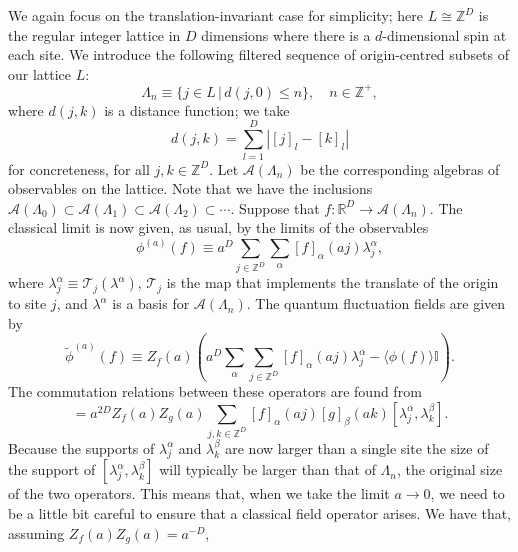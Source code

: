 \documentclass[prl,twocolumn,lengthcheck,superscriptaddress]{revtex4-1}
\theoremstyle{definition}
\theoremstyle{remark}
\begin{document}
We again focus on the translation-invariant case for simplicity; here $L\cong \mathbb{Z}^{D}$ is the regular integer lattice in $D$ dimensions where there is a $d$-dimensional spin at each site.  We introduce the following filtered sequence of origin-centred subsets of our lattice $L$:
\begin{equation}
	\Lambda_n \equiv \{j\in L\,|\, d(j,0) \le n\}, \quad n\in \mathbb{Z}^+,
\end{equation}
where $d(j,k)$ is a distance function; we take
\begin{equation}
	d(j,k) = \sum_{l=1}^D |[j]_l-[k]_l|
\end{equation}
for concreteness, for all $j,k\in \mathbb{Z}^D$. Let $\mathcal{A}(\Lambda_n)$ be the corresponding algebras of observables on the lattice. Note that we have the inclusions $\mathcal{A}(\Lambda_0)\subset\mathcal{A}(\Lambda_1)\subset \mathcal{A}(\Lambda_2) \subset \cdots$. Suppose that $f:\mathbb{R}^D\rightarrow \mathcal{A}(\Lambda_n)$. The classical limit is now given, as usual, by the limits of the observables
\begin{equation}
	\phi^{(a)}(f) \equiv a^D\sum_{j\in\mathbb{Z}^D} \sum_{\alpha} [f]_\alpha(aj) \lambda_j^\alpha,
\end{equation}
where $\lambda_j^\alpha \equiv \mathcal{T}_j(\lambda^\alpha)$, $\mathcal{T}_j$ is the map that implements the translate of the origin to site $j$, and $\lambda^\alpha$ is a basis for $\mathcal{A}(\Lambda_n)$. The quantum fluctuation fields are given by
\begin{equation}
	\widetilde{\phi}^{(a)}(f) \equiv Z_f(a)\left( a^D\sum_{\alpha}\sum_{j\in \mathbb{Z}^D} [f]_\alpha(aj) \lambda^\alpha_j - \langle\phi(f)\rangle\mathbb{I}\right).
\end{equation}
The commutation relations between these operators are found from 
\begin{equation}
	[\widetilde{\phi}^{(a)}(f), \widetilde{\phi}^{(a)}(g)] = a^{2D}Z_f(a)Z_g(a)\sum_{j,k\in\mathbb{Z}^D} [f]_\alpha(aj)[g]_\beta(ak) [\lambda_j^\alpha, \lambda_k^\beta]. 
\end{equation} 
Because the supports of $\lambda_j^\alpha$ and $\lambda_k^\beta$ are now larger than a single site the size of the support of $[\lambda_j^\alpha, \lambda_k^\beta]$ will typically be larger than that of $\Lambda_n$, the original size of the two operators. This means that, when we take the limit $a\rightarrow 0$, we need to be a little bit careful to ensure that a classical field operator arises. We have that, assuming $Z_f(a)Z_g(a) = a^{-D}$,
\end{document}
